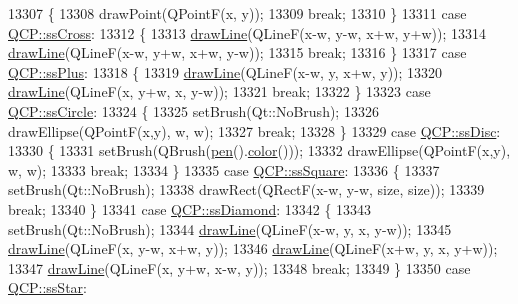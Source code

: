 \begin{DoxyCode}
13307     \{
13308       drawPoint(QPointF(x, y));
13309       \textcolor{keywordflow}{break};
13310     \}
13311     \textcolor{keywordflow}{case} \hyperlink{a00143_af66d0711d42fe78d96c28abadc67f26fab1d52c10ee4b09fe17854be238055f30}{QCP::ssCross}:
13312     \{
13313       \hyperlink{a00047_a0b4b1b9bd495e182c731774dc800e6e0}{drawLine}(QLineF(x-w, y-w, x+w, y+w));
13314       \hyperlink{a00047_a0b4b1b9bd495e182c731774dc800e6e0}{drawLine}(QLineF(x-w, y+w, x+w, y-w));
13315       \textcolor{keywordflow}{break};
13316     \}
13317     \textcolor{keywordflow}{case} \hyperlink{a00143_af66d0711d42fe78d96c28abadc67f26fa82b8526e3bfa7d0cccc1fd5eb16505ac}{QCP::ssPlus}:
13318     \{
13319       \hyperlink{a00047_a0b4b1b9bd495e182c731774dc800e6e0}{drawLine}(QLineF(x-w, y, x+w, y));
13320       \hyperlink{a00047_a0b4b1b9bd495e182c731774dc800e6e0}{drawLine}(QLineF(x, y+w, x, y-w));
13321       \textcolor{keywordflow}{break};
13322     \}
13323     \textcolor{keywordflow}{case} \hyperlink{a00143_af66d0711d42fe78d96c28abadc67f26fa13ed43d724ecefa84baae4179de3bd8d}{QCP::ssCircle}:
13324     \{
13325       setBrush(Qt::NoBrush);
13326       drawEllipse(QPointF(x,y), w, w);
13327       \textcolor{keywordflow}{break};
13328     \}
13329     \textcolor{keywordflow}{case} \hyperlink{a00143_af66d0711d42fe78d96c28abadc67f26fa6d1fd37ccd5f6fdea72992feb522a342}{QCP::ssDisc}:
13330     \{
13331       setBrush(QBrush(\hyperlink{a00116_a1f13fffa0a0faac34ec342973e613a4a}{pen}().\hyperlink{a00116_ae35093fbf4f645dcefd930ca8c68b622}{color}()));
13332       drawEllipse(QPointF(x,y), w, w);
13333       \textcolor{keywordflow}{break};
13334     \}
13335     \textcolor{keywordflow}{case} \hyperlink{a00143_af66d0711d42fe78d96c28abadc67f26fae613e80d80910579c17a5ed90e9137b0}{QCP::ssSquare}:
13336     \{
13337       setBrush(Qt::NoBrush);
13338       drawRect(QRectF(x-w, y-w, size, size));
13339       \textcolor{keywordflow}{break};
13340     \}
13341     \textcolor{keywordflow}{case} \hyperlink{a00143_af66d0711d42fe78d96c28abadc67f26fa6daa1761cab7e529768b84460f2b5141}{QCP::ssDiamond}:
13342     \{
13343       setBrush(Qt::NoBrush);
13344       \hyperlink{a00047_a0b4b1b9bd495e182c731774dc800e6e0}{drawLine}(QLineF(x-w, y, x, y-w));
13345       \hyperlink{a00047_a0b4b1b9bd495e182c731774dc800e6e0}{drawLine}(QLineF(x, y-w, x+w, y));
13346       \hyperlink{a00047_a0b4b1b9bd495e182c731774dc800e6e0}{drawLine}(QLineF(x+w, y, x, y+w));
13347       \hyperlink{a00047_a0b4b1b9bd495e182c731774dc800e6e0}{drawLine}(QLineF(x, y+w, x-w, y));
13348       \textcolor{keywordflow}{break};
13349     \}
13350     \textcolor{keywordflow}{case} \hyperlink{a00143_af66d0711d42fe78d96c28abadc67f26fa8d380c3956b53e1d12d8248de77e4f3c}{QCP::ssStar}:

\end{DoxyCode}
